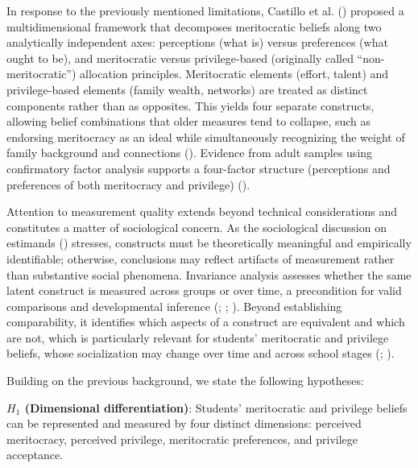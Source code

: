 \documentclass[
  11pt,
]{article}
\begin{document}
In response to the previously mentioned limitations, Castillo et al.
() proposed a
multidimensional framework that decomposes meritocratic beliefs along
two analytically independent axes: perceptions (what is) versus
preferences (what ought to be), and meritocratic versus privilege-based
(originally called ``non-meritocratic'') allocation principles.
Meritocratic elements (effort, talent) and privilege-based elements
(family wealth, networks) are treated as distinct components rather than
as opposites. This yields four separate constructs, allowing belief
combinations that older measures tend to collapse, such as endorsing
meritocracy as an ideal while simultaneously recognizing the weight of
family background and connections (). Evidence from adult samples using confirmatory
factor analysis supports a four-factor structure (perceptions and
preferences of both meritocracy and privilege)
().

Attention to measurement quality extends beyond technical considerations
and constitutes a matter of sociological concern. As the sociological
discussion on estimands () stresses, constructs must be theoretically meaningful and
empirically identifiable; otherwise, conclusions may reflect artifacts
of measurement rather than substantive social phenomena. Invariance
analysis assesses whether the same latent construct is measured across
groups or over time, a precondition for valid comparisons and
developmental inference (; ; ). Beyond establishing comparability, it identifies which aspects
of a construct are equivalent and which are not, which is particularly
relevant for students' meritocratic and privilege beliefs, whose
socialization may change over time and across school stages
(;
).

Building on the previous background, we state the following hypotheses:

\textbf{\(H_1\) (Dimensional differentiation)}: Students' meritocratic
and privilege beliefs can be represented and measured by four distinct
dimensions: perceived meritocracy, perceived privilege, meritocratic
preferences, and privilege acceptance.
\end{document}
